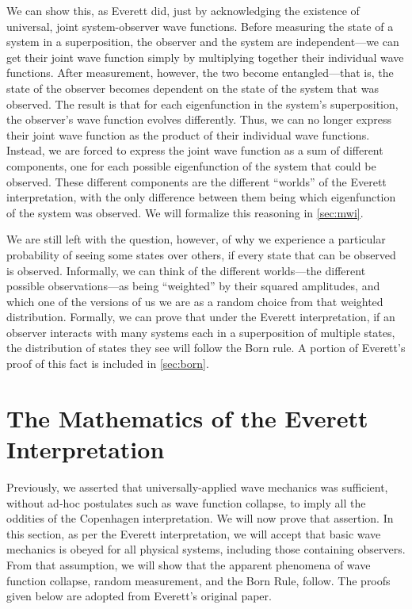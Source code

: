 \documentclass[
    12pt,
    letterpaper,
    aps,
    prd,
    longbibliography,
    twocolumn,
    nofootinbib,
    raggedbottom,
    amsmath,
    amssymb,
    amsfonts,
]{revtex4-1}
\begin{document}
We can show this, as Everett did, just by acknowledging the existence of universal, joint system-observer wave functions.\cite{everett}\cite{relativestate} Before measuring the state of a system in a superposition, the observer and the system are independent---we can get their joint wave function simply by multiplying together their individual wave functions. After measurement, however, the two become entangled---that is, the state of the observer becomes dependent on the state of the system that was observed. The result is that for each eigenfunction in the system's superposition, the observer's wave function evolves differently. Thus, we can no longer express their joint wave function as the product of their individual wave functions. Instead, we are forced to express the joint wave function as a sum of different components, one for each possible eigenfunction of the system that could be observed. These different components are the different ``worlds'' of the Everett interpretation, with the only difference between them being which eigenfunction of the system was observed. We will formalize this reasoning in \autoref{sec:mwi}.

We are still left with the question, however, of why we experience a particular probability of seeing some states over others, if every state that can be observed is observed. Informally, we can think of the different worlds---the different possible observations---as being ``weighted'' by their squared amplitudes, and which one of the versions of us we are as a random choice from that weighted distribution. Formally, we can prove that under the Everett interpretation, if an observer interacts with many systems each in a superposition of multiple states, the distribution of states they see will follow the Born rule.\cite{everett}\cite{relativestate}\cite{bornproof1}\cite{bornproof2}\cite{bornproof3}\cite{bornproof2summary} A portion of Everett's proof of this fact is included in \autoref{sec:born}.

\section{The Mathematics of the Everett Interpretation}
\label{sec:math}

Previously, we asserted that universally-applied wave mechanics was sufficient, without ad-hoc postulates such as wave function collapse, to imply all the oddities of the Copenhagen interpretation. We will now prove that assertion. In this section, as per the Everett interpretation, we will accept that basic wave mechanics is obeyed for all physical systems, including those containing observers. From that assumption, we will show that the apparent phenomena of wave function collapse, random measurement, and the Born Rule, follow. The proofs given below are adopted from Everett's original paper.\cite{everett}\cite{relativestate}
\end{document}
